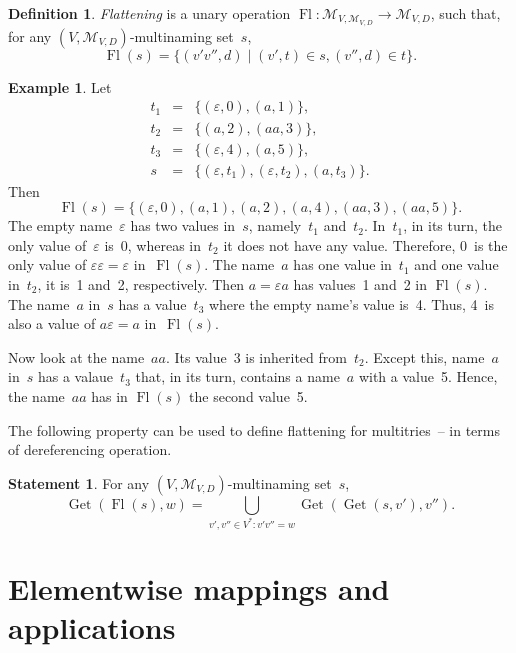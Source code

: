\documentclass{article}
\theoremstyle{definition}
\newtheorem{Df}{Definition}
\newtheorem{St}{Statement}
\newtheorem{Ex}{Example}
\newcommand{\setcharmvcn}{M}
\newcommand{\setsymbol}[3]{\mathcal{#1}_{#2,#3}}
\newcommand{\setmvcn}[2]{\setsymbol{\setcharmvcn}{#1}{#2}}
\newcommand{\flatten}{\operatorname{Fl}}
\newcommand{\deref}{\operatorname{Get}}
\begin{document}
\begin{Df}\label{df:flatten}
\emph{Flattening} is a unary operation
$\flatten : \setmvcn{V}{\setmvcn{V}{D}} \to\setmvcn{V}{D}$,
such that, for any $(V,\setmvcn{V}{D})$-multinaming set~$s$,
\[
  \flatten(s) = \{ (v'v'', d) \mid (v', t) \in s, (v'', d) \in t \} .
\]
\end{Df}

\begin{Ex}\label{ex:flatten}
Let
\begin{eqnarray*}
  t_1 & = & \{ (\varepsilon, 0), (a, 1) \} ,\\
  t_2 & = & \{ (a, 2), (aa, 3) \} ,\\
  t_3 & = & \{ (\varepsilon, 4), (a, 5) \} ,\\
  s   & = & \{ (\varepsilon, t_1), (\varepsilon, t_2), (a, t_3) \} .
\end{eqnarray*}
Then
\[
  \flatten(s) = \{
      (\varepsilon, 0), (a, 1), (a, 2), (a, 4), (aa, 3), (aa, 5)
  \} .
\]
The empty name~$\varepsilon$ has two values in~$s$, namely~$t_1$ and~$t_2$.
In~$t_1$, in its turn, the only value of~$\varepsilon$ is~0, whereas in~$t_2$
it does not have any value. Therefore, 0~is the only value of $\varepsilon
\varepsilon = \varepsilon$ in~$\flatten(s)$.  The name~$a$ has one value in~$t_1$
and one value in~$t_2$, it is~1 and~2, respectively.  Then $a = \varepsilon a$
has values~1 and~2 in $\flatten(s)$.  The name~$a$ in~$s$ has a value~$t_3$
where the empty name's value is~4. Thus, 4~is also a value of $a \varepsilon =
a$ in~$\flatten(s)$.

Now look at the name~$aa$. Its value~3 is inherited from~$t_2$. Except this,
name~$a$ in~$s$ has a valaue~$t_3$ that, in its turn, contains a name~$a$ with
a value~5. Hence, the name~$aa$ has in $\flatten(s)$ the second value~5.
\end{Ex}

The following property can be used to define flattening for multitries~--
in terms of dereferencing operation.
\begin{St}\label{st:deref-flatten}
For any $(V,\setmvcn{V}{D})$-multinaming set~$s$,
\[
  \deref(\flatten(s), w) =
      \bigcup_{v',v''\in V^\ast: v' v'' = w}
        \deref(\deref(s, v'), v'') .
\]
\end{St}



\section{Elementwise mappings and applications}
\end{document}
